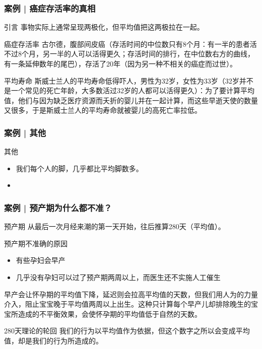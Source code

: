 \begin{frame}
  \frametitle{案例 | 癌症存活率的真相}
  \begin{block}{引言}
    事物实际上通常呈现两极化，但平均值把这两极拉在一起。
  \end{block}
  \pause
  \begin{block}{癌症存活率}
    古尔德，腹部间皮癌（存活时间的中位数只有8个月：有一半的患者活不过8个月，另一半的人可以活得更久；存活时间的排行，在中位数右方的曲线，有一条延伸数年的尾巴），存活了20年（因为另一种不相关的癌症而过世）。
  \end{block}
  \pause
  \begin{block}{平均寿命}
    斯威士兰人的平均寿命低得吓人，男性为32岁，女性为33岁（32岁并不是一个常见的死亡年龄，大多数活过32岁的人都可以活得更久）：为了要计算平均值，他们与因为缺乏医疗资源而夭折的婴儿并在一起计算，而这些早逝天使的数量又很多，于是斯威士兰人的平均寿命就被婴儿的高死亡率拉低。
  \end{block}
\end{frame}

\begin{frame}
  \frametitle{案例 | 其他}
  \begin{block}{其他}
    \begin{itemize}
      \item 我们每个人的脚，几乎都比平均脚数多。
      \item 
    \end{itemize}
  \end{block}
\end{frame}

\begin{frame}
  \frametitle{案例 | 预产期为什么都不准？}
  \begin{block}{预产期}
    从最后一次月经来潮的第一天开始，往后推算280天（平均值）。
  \end{block}
  \pause
  \begin{block}{预产期不准确的原因}
    \begin{itemize}
      \item 有些孕妇会早产
      \item 几乎没有孕妇可以过了预产期两周以上，而医生还不实施人工催生
    \end{itemize}
    早产会让怀孕期的平均值下降，延迟则会拉高平均值的天数，但我们用人为的力量介入，阻止宝宝晚于平均值两周以上出生。这种只计算每个早产儿却排除晚生的宝宝所造成的不平衡效果，会使怀孕期的平均值低于自然的天数。
  \end{block}
  \pause
  \begin{block}{280天理论的轮回}
    我们的行为以平均值作为依据，但这个数字之所以会变成平均值，却是我们的行为所造成的。
  \end{block}
\end{frame}

